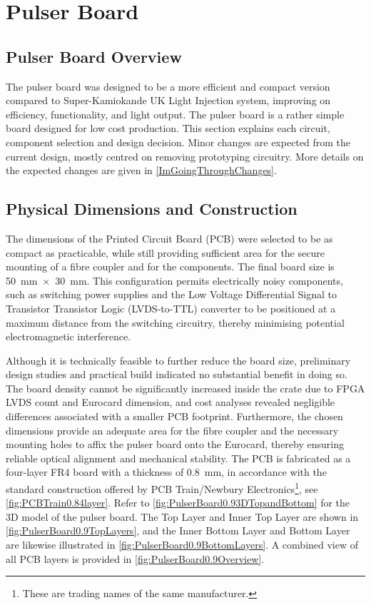 \documentclass[a4paper,11pt]{article}
\begin{document}
\section{Pulser Board}\label{sec:LEDpulser}

\subsection{Pulser Board Overview}

The pulser board was designed to be a more efficient and compact version compared to Super-Kamiokande UK Light Injection system, improving on efficiency, functionality, and light output. The pulser board is a rather simple board designed for low cost production. This section explains each circuit, component selection and design decision. Minor changes are expected from the current design, mostly centred on removing prototyping circuitry. More details on the expected changes are given in \cref{ImGoingThroughChanges}.


\subsection{Physical Dimensions and Construction}

The dimensions of the Printed Circuit Board (PCB) were selected to be as compact as practicable, while still providing sufficient area for the secure mounting of a fibre coupler and for the components. The final board size is 50~mm~$\times$~30~mm. This configuration permits electrically noisy components, such as switching power supplies and the Low Voltage Differential Signal to Transistor Transistor Logic (LVDS-to-TTL) converter to be positioned at a maximum distance from the switching circuitry, thereby minimising potential electromagnetic interference.

Although it is technically feasible to further reduce the board size, preliminary design studies and practical build indicated no substantial benefit in doing so. The board density cannot be significantly increased inside the crate due to  FPGA LVDS count and Eurocard dimension, and cost analyses revealed negligible differences associated with a smaller PCB footprint. Furthermore, the chosen dimensions provide an adequate area for the fibre coupler and the necessary mounting holes to affix the pulser board onto the Eurocard, thereby ensuring reliable optical alignment and mechanical stability.
The PCB is fabricated as a four-layer FR4 \cite{FR-4}  board with a thickness of 0.8~mm, in accordance with the standard construction offered by PCB Train/Newbury Electronics\footnote{These are trading names of the same manufacturer.}, see \cref{fig:PCBTrain0.84layer}. Refer to \cref{fig:PulserBoard0.93DTopandBottom} for the 3D model of the pulser board. The Top Layer and Inner Top Layer are shown in \cref{fig:PulserBoard0.9TopLayers}, and the Inner Bottom Layer and Bottom Layer are likewise illustrated in \cref{fig:PulserBoard0.9BottomLayers}. A combined view of all PCB layers is provided in \cref{fig:PulserBoard0.9Overview}.
\end{document}
